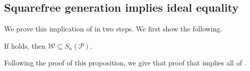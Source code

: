 \subsection{Squarefree generation implies ideal equality}
We prove this implication of  in two steps.
We first show the following.

\begin{proposition}
\label{prop:1-implies-avoidance}
If  holds, then $\mathcal W\subseteq S_n(\mathcal{P})$.
\end{proposition}

Following the proof of this proposition, we give that proof that  implies all of .

